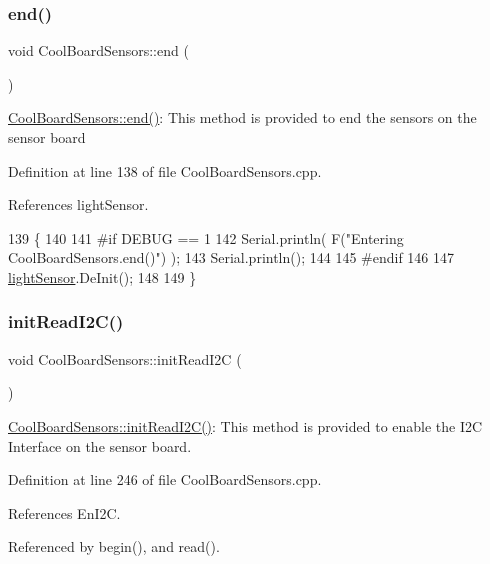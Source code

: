 \subsubsection{\texorpdfstring{end()}{end()}}
{\footnotesize\ttfamily void Cool\+Board\+Sensors\+::end (\begin{DoxyParamCaption}{ }\end{DoxyParamCaption})}

\hyperlink{classCoolBoardSensors_a4902b69f6e628bd6557193758fdd2bae}{Cool\+Board\+Sensors\+::end()}\+: This method is provided to end the sensors on the sensor board 

Definition at line 138 of file Cool\+Board\+Sensors.\+cpp.



References light\+Sensor.


\begin{DoxyCode}
139 \{
140 
141 \textcolor{preprocessor}{#if DEBUG == 1  }
142     Serial.println( F(\textcolor{stringliteral}{"Entering CoolBoardSensors.end()"}) );
143     Serial.println();
144 
145 \textcolor{preprocessor}{#endif}
146 
147     \hyperlink{classCoolBoardSensors_a3e397300fb707dd193e909a757bf6102}{lightSensor}.DeInit();
148 
149 \}
\end{DoxyCode}
\mbox{\label{classCoolBoardSensors_acad6a8418c66d36868caca23c844ecb6}} 
\subsubsection{\texorpdfstring{init\+Read\+I2\+C()}{initReadI2C()}}
{\footnotesize\ttfamily void Cool\+Board\+Sensors\+::init\+Read\+I2C (\begin{DoxyParamCaption}{ }\end{DoxyParamCaption})}

\hyperlink{classCoolBoardSensors_acad6a8418c66d36868caca23c844ecb6}{Cool\+Board\+Sensors\+::init\+Read\+I2\+C()}\+: This method is provided to enable the I2C Interface on the sensor board. 

Definition at line 246 of file Cool\+Board\+Sensors.\+cpp.



References En\+I2C.



Referenced by begin(), and read().


